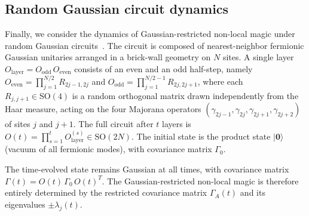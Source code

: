 \documentclass[prx,twocolumn,superscriptaddress,aps,10pt, frontmatterverbose, reprint,footinbib,longbibliography=true]{revtex4-2}
\begin{document}
\subsection{Random Gaussian circuit dynamics}
Finally, we consider the dynamics of Gaussian-restricted non-local magic under random Gaussian circuits~\cite{tirrito2025magicphasetransitionsmonitored}.
The circuit is composed of nearest-neighbor fermionic Gaussian unitaries arranged in a brick-wall geometry on $N$ sites.
A single layer $O_{\mathrm{layer}} = O_{\mathrm{odd}}\,O_{\mathrm{even}}$ consists of an even and an odd half-step, namely $O_{\mathrm{even}} = \prod_{j=1}^{N/2} R_{2j-1,2j}$ and $O_{\mathrm{odd}} = \prod_{j=1}^{N/2-1} R_{2j,2j+1}$, where each $R_{j,j+1} \in \mathrm{SO}(4)$ is a random orthogonal matrix drawn independently from the Haar measure, acting on the four Majorana operators $(\gamma_{2j-1}, \gamma_{2j}, \gamma_{2j+1}, \gamma_{2j+2})$ of sites $j$ and $j+1$.
The full circuit after $t$ layers is $O(t) = \prod_{s=1}^t O_{\mathrm{layer}}^{(s)} \in \mathrm{SO}(2N)$.
The initial state is the product state $|\mathbf{0}\rangle$ (vacuum of all fermionic modes), with covariance matrix $\Gamma_0$. 

The time-evolved state remains Gaussian at all times, with covariance matrix $\Gamma(t) = O(t)\,\Gamma_0\,O(t)^T$.
The Gaussian-restricted non-local magic is therefore entirely determined by the restricted covariance matrix $\Gamma_A(t)$ and its eigenvalues $\pm\lambda_j(t)$.
\end{document}
